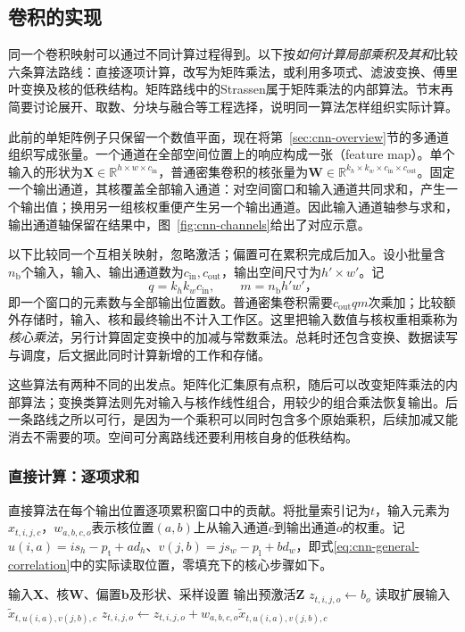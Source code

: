 \subsection{卷积的实现}
\label{sec:cnn-implementation}

同一个卷积映射可以通过不同计算过程得到。以下按\emph{如何计算局部乘积及其和}比较六条算法路线：直接逐项计算，改写为矩阵乘法，或利用多项式、滤波变换、傅里叶变换及核的低秩结构。矩阵路线中的Strassen属于矩阵乘法的内部算法。节末再简要讨论展开、取数、分块与融合等工程选择，说明同一算法怎样组织实际计算。

此前的单矩阵例子只保留一个数值平面，现在将第~\ref{sec:cnn-overview}节的多通道组织写成张量。一个通道在全部空间位置上的响应构成一张（feature map）。单个输入的形状为$\bm X\in\mathbb R^{h\times w\times c_{\mathrm{in}}}$，普通密集卷积的核张量为$\bm W\in\mathbb R^{k_h\times k_w\times c_{\mathrm{in}}\times c_{\mathrm{out}}}$。固定一个输出通道，其核覆盖全部输入通道：对空间窗口和输入通道共同求和，产生一个输出值；换用另一组核权重便产生另一个输出通道。因此输入通道轴参与求和，输出通道轴保留在结果中，图~\ref{fig:cnn-channels}给出了对应示意。

以下比较同一个互相关映射，忽略激活；偏置可在累积完成后加入。设小批量含$n_{\mathrm b}$个输入，输入、输出通道数为$c_{\mathrm{in}},c_{\mathrm{out}}$，输出空间尺寸为$h'\times w'$。记
\[
  q=k_hk_wc_{\mathrm{in}},\qquad m=n_{\mathrm b}h'w'\text{，}
\]
即一个窗口的元素数与全部输出位置数。普通密集卷积需要$c_{\mathrm{out}}qm$次乘加；比较额外存储时，输入、核和最终输出不计入工作区。这里把输入数值与核权重相乘称为\emph{核心乘法}，另行计算固定变换中的加减与常数乘法。总耗时还包含变换、数据读写与调度，后文据此同时计算新增的工作和存储。

这些算法有两种不同的出发点。矩阵化汇集原有点积，随后可以改变矩阵乘法的内部算法；变换类算法则先对输入与核作线性组合，用较少的组合乘法恢复输出。后一条路线之所以可行，是因为一个乘积可以同时包含多个原始乘积，后续加减又能消去不需要的项。空间可分离路线还要利用核自身的低秩结构。

\subsubsection{直接计算：逐项求和}
\label{sec:cnn-direct-implementation}

直接算法在每个输出位置逐项累积窗口中的贡献。将批量索引记为$t$，输入元素为$x_{t,i,j,c}$，$w_{a,b,c,o}$表示核位置$(a,b)$上从输入通道$c$到输出通道$o$的权重。记$u(i,a)=is_h-p_{\mathrm t}+ad_h$、$v(j,b)=js_w-p_{\mathrm l}+bd_w$，即式\eqref{eq:cnn-general-correlation}中的实际读取位置，零填充下的核心步骤如下。
\begin{algorithm}[直接多通道互相关]
  \label{alg:cnn-direct}
  \begin{algorithmic}[1]
    \Require 输入$\bm X$、核$\bm W$、偏置$\bm b$及形状、采样设置
    \Ensure 输出预激活$\bm Z$
      \State $z_{t,i,j,o}\gets b_o$
        \State 读取扩展输入$\widetilde x_{t,u(i,a),v(j,b),c}$
        \State $z_{t,i,j,o}\gets z_{t,i,j,o}+w_{a,b,c,o}\widetilde x_{t,u(i,a),v(j,b),c}$
      \EndFor
    \EndFor
  \end{algorithmic}
\end{algorithm}

